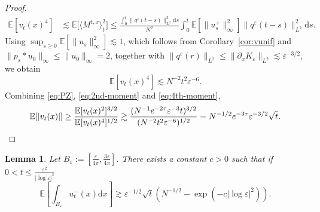 \documentclass[a4paper,12pt]{article}
\newcommand{\mathd}{\mathrm{d}}
\newtheorem{lemma}[theorem]{Lemma}
\newcommand{\E}{\mathbb{E}}
\begin{document}
\begin{proof}
\begin{align*}
    \mathbb{E}[v_t(x)^4] & \lesssim \mathbb{E}\big[\langle M^{t,x}\rangle_t^2\big] \leq \frac{\int_0^t \|q^\varepsilon(t-s)\|_{L^2}^2 \mathd s}{N^2} \int_0^t\E[\|u_s^+\|_\infty^2] \|q^\varepsilon(t-s)\|_{L^2}^2 \mathd s.
\end{align*}
Using $\sup_{s\geq0}\mathbb{E}[\|u_s\|_\infty^2]\lesssim 1$, which follows from
Corollary~\ref{cor:vunif} and $\|p_s\ast u_0\|_\infty\leq\|u_0\|_\infty=2$,
together with $\|q^\varepsilon(r)\|_{L^2}\leq\|\partial_x K_\varepsilon\|_{L^2}
\lesssim\varepsilon^{-3/2}$, we obtain
\begin{equation}\label{eq:4th-moment}
    \mathbb{E}[v_t(x)^4]\lesssim N^{-2}t^2\varepsilon^{-6}.
\end{equation}
Combining \eqref{eq:PZ}, \eqref{eq:2nd-moment} and
\eqref{eq:4th-moment},
\[
    \mathbb{E}[|v_t(x)|]\geq
    \frac{\mathbb{E}[v_t(x)^2]^{3/2}}{\mathbb{E}[v_t(x)^4]^{1/2}}
    \gtrsim \frac{(N^{-1}e^{-2\tau}\varepsilon^{-3}t)^{3/2}}
    {(N^{-2}t^2\varepsilon^{-6})^{1/2}}
    = N^{-1/2}e^{-3\tau}\varepsilon^{-3/2}\sqrt{t}. \qedhere
\]
\end{proof}







\begin{lemma} \label{lem:lower-bound-Beps-int} 
Let $B_\varepsilon:= [\frac{\varepsilon}{4 \pi}, \frac{3 \varepsilon}{4 \pi}]$. There exists a constant $c >0$ such that if $0 < t \leq \frac{\varepsilon^2}{|\log \varepsilon|^2}$
\begin{equation}
\mathbb{E}\left[\int_{B_\varepsilon} u_t^{-}(x) \mathd x\right] \gtrsim \varepsilon^{-1/2}  \sqrt{t}(N^{-1/2} - \exp(-c|\log \varepsilon|^2)).
\end{equation} 
\end{lemma}
\end{document}
